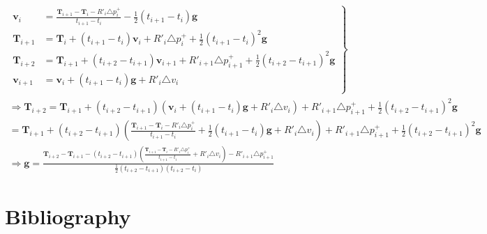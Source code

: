\documentclass[12pt]{article}   %
\newcounter{case}
\begin{document}
\begin{align}
\left.\begin{aligned}%
\textbf{v}_i &= \frac{\textbf{T}_{i+1} - \textbf{T}_{i} - R'_i \triangle p^{+}_{i}} {t_{i+1} - t_{i}} - \frac{1}{2} (t_{i+1} - t_{i}) \textbf{g} \\
%
\textbf{T}_{i+1} &= \textbf{T}_{i} + (t_{i+1} - t_{i})\textbf{v}_i + R'_i \triangle p^{+}_{i} + \frac{1}{2} (t_{i+1} - t_{i})^2 \textbf{g} \\
\textbf{T}_{i+2} &= \textbf{T}_{i+1} + (t_{i+2} - t_{i+1})\textbf{v}_{i+1} + R'_{i+1} \triangle p^{+}_{i+1} + \frac{1}{2} (t_{i+2} - t_{i+1})^2 \textbf{g} \\
\textbf{v}_{i+1} &= \textbf{v}_i + (t_{i+1} - t_i) \textbf{g} + R'_i \triangle v_i \\
\end{aligned} 
\right\} \\%
\Longrightarrow \textbf{T}_{i+2} = \textbf{T}_{i+1} + (t_{i+2} - t_{i+1})(\textbf{v}_{i} + (t_{i+1} - t_i) \textbf{g} + R'_i \triangle v_i) + R'_{i+1} \triangle p^{+}_{i+1} + \frac{1}{2} (t_{i+2} - t_{i+1})^2 \textbf{g} & \\
    = \textbf{T}_{i+1} + (t_{i+2} - t_{i+1})(\frac{\textbf{T}_{i+1} - \textbf{T}_{i} - R'_i \triangle p^{+}_{i}} {t_{i+1} - t_{i}} + \frac{1}{2} (t_{i+1} - t_{i}) \textbf{g} + R'_i \triangle v_i) + R'_{i+1} \triangle p^{+}_{i+1} + \frac{1}{2} (t_{i+2} - t_{i+1})^2 \textbf{g} & \\
\Longrightarrow \textbf{g} = \frac{\textbf{T}_{i+2}-\textbf{T}_{i+1}-(t_{i+2}-t_{i+1})(\frac{\textbf{T}_{i+1}-\textbf{T}_{i} - R'_i \triangle p^+_i}{t_{i+1}-t_i} + R'_i \triangle v_i) - R'_{i+1} \triangle p^+_{i+1}}{\frac{1}{2} (t_{i+2}-t_{i+1})(t_{i+2} - t_i)} & 
\end{align}


\newpage %
\section{Bibliography}
\label{Bibliography}




\end{document}
